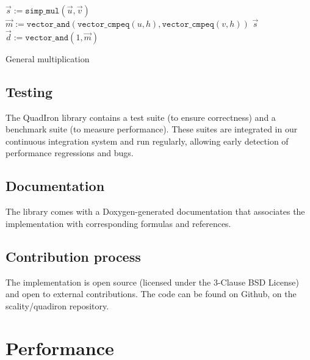 \documentclass[oneside,9pt]{article}
\begin{document}
\begin{algorithm}[]
 $\vec{s} := \texttt{simp\_mul}(\vec{u}, \vec{v})$\;
 $\vec{m} := \texttt{vector\_and}(\texttt{vector\_cmpeq}(u, h), \texttt{vector\_cmpeq}(v, h))$\;
   { \Return $\vec{s}$ }
  $\vec{d} := \texttt{vector\_and}(1, \vec{m})$\;
 \caption{General multiplication}
\end{algorithm}

\subsection{Testing}

The QuadIron library contains a test suite (to ensure correctness) and a benchmark suite (to measure  performance).
These suites are integrated in our continuous integration system and run regularly, allowing early detection of performance regressions and bugs.

\subsection{Documentation}

The library comes with a Doxygen-generated documentation that associates the implementation with corresponding formulas and references.

\subsection{Contribution process}

The implementation is open source (licensed under the 3-Clause BSD License) and open to external contributions. The code can be found on Github, on the scality/quadiron repository.


\section{Performance}
\end{document}
